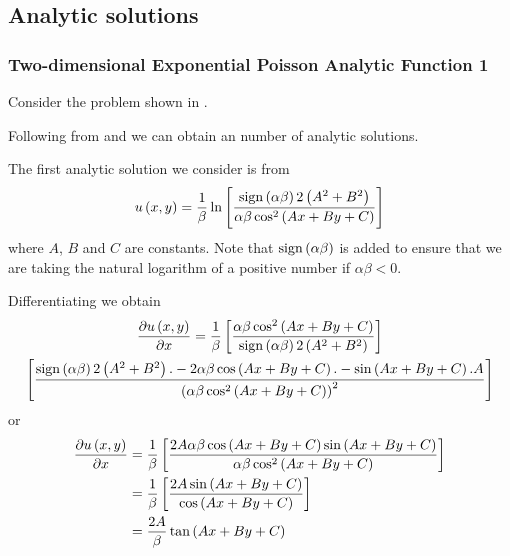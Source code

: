 \subsection{Analytic solutions}

\subsubsection{Two-dimensional Exponential Poisson Analytic Function 1}

Consider the problem shown in . 


Following from \citet{polyanin:2004} and \citet{crowdy:1997} we can
obtain an number of analytic solutions.

The first analytic solution we consider is from
\begin{equation}
   u\left( x,y \right) =\dfrac{1}{\beta}\ln\left[ \dfrac{  \operatorname{sign}\left( \alpha\beta \right)  2\left( A^{2}+B^{2} \right)}{\alpha\beta\cos^{2}\left( Ax+By+C \right)} \right] 
\end{equation}
where $A$, $B$ and $C$ are constants. Note that $  \operatorname{sign}\left( \alpha\beta \right)  $
is added to ensure that we are taking the natural logarithm of a
positive number if $\alpha\beta<0$.

Differentiating we obtain
\begin{multline}
   \dfrac{\partial  u\left( x,y \right) }{\partial x} =\dfrac{1}{\beta}\left[ \dfrac{\alpha\beta\cos^{2}\left( Ax+By+C \right)}{  \operatorname{sign}\left( \alpha\beta \right)  2\left( A^{2}+B^{2} \right)} \right]\\
  \left[ \dfrac{  \operatorname{sign}\left( \alpha\beta \right)  2\left( A^{2}+B^{2} \right).-2\alpha\beta\cos\left( Ax+By+C \right).-\sin\left( Ax+By+C \right).A}{\left( \alpha\beta\cos^{2}\left( Ax+By+C \right) \right)^{2}} \right]
\end{multline}
or
\begin{equation}
  \begin{aligned}
     \dfrac{\partial  u\left( x,y \right) }{\partial x} &=\dfrac{1}{\beta}\left[ \dfrac{2A\alpha\beta\cos\left( Ax+By+C \right)\sin\left( Ax+By+C \right)}{\alpha\beta\cos^{2}\left( Ax+By+C \right)} \right]\\
    &=\dfrac{1}{\beta}\left[ \dfrac{2A\sin\left( Ax+By+C \right)}{\cos\left( Ax+By+C \right)} \right] \\
    &=\dfrac{2A}{\beta}\tan\left( Ax+By+C \right)
  \end{aligned}
\end{equation}

